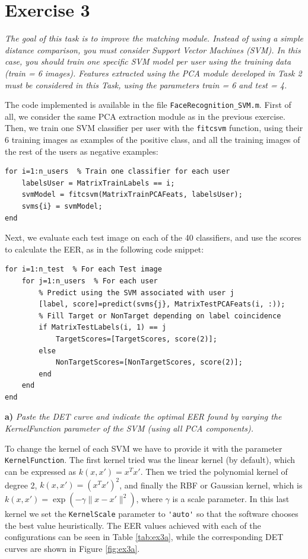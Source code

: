 \documentclass[11pt]{article}
\begin{document}
\section*{Exercise 3}

\textit{The goal of this task is to improve the matching module. Instead of using a simple distance comparison, you must consider Support Vector Machines (SVM). In this case, you should train one specific SVM model per user using the training data (train = 6 images). Features extracted using the PCA module developed in Task 2 must be considered in this Task, using the parameters train = 6 and test = 4.}

The code implemented is available in the file \verb|FaceRecognition_SVM.m|. First of all, we consider the same PCA extraction module as in the previous exercise. Then, we train one SVM classifier per user with the \verb|fitcsvm| function, using their 6 training images as examples of the positive class, and all the training images of the rest of the users as negative examples:

\begin{verbatim}
for i=1:n_users  % Train one classifier for each user
    labelsUser = MatrixTrainLabels == i;
    svmModel = fitcsvm(MatrixTrainPCAFeats, labelsUser);
    svms{i} = svmModel;
end
\end{verbatim}

Next, we evaluate each test image on each of the 40 classifiers, and use the scores to calculate the EER, as in the following code snippet:

\begin{verbatim}
for i=1:n_test  % For each Test image
    for j=1:n_users  % For each user
        % Predict using the SVM associated with user j
        [label, score]=predict(svms{j}, MatrixTestPCAFeats(i, :));
        % Fill Target or NonTarget depending on label coincidence
        if MatrixTestLabels(i, 1) == j
            TargetScores=[TargetScores, score(2)];
        else
            NonTargetScores=[NonTargetScores, score(2)];
        end
    end
end
\end{verbatim}


\textbf{a)} \emph{Paste the DET curve and indicate the optimal EER found by varying the KernelFunction parameter of the SVM (using all PCA components).}

To change the kernel of each SVM we have to provide it with the parameter \verb|KernelFunction|. The first kernel tried was the linear kernel (by default), which can be expressed as $k(x, x')=x^Tx'$. Then we tried the polynomial kernel of degree 2, $k(x, x')=(x^Tx')^2$, and finally the RBF or Gaussian kernel, which is $k(x, x')=\exp(-\gamma\lVert x - x'\rVert^2)$, where $\gamma$ is a scale parameter. In this last kernel we set the \verb|KernelScale| parameter to \verb|'auto'| so that the software chooses the best value heuristically. The EER values achieved with each of the configurations can be seen in Table \ref{tab:ex3a}, while the corresponding DET curves are shown in Figure \ref{fig:ex3a}.
\end{document}
